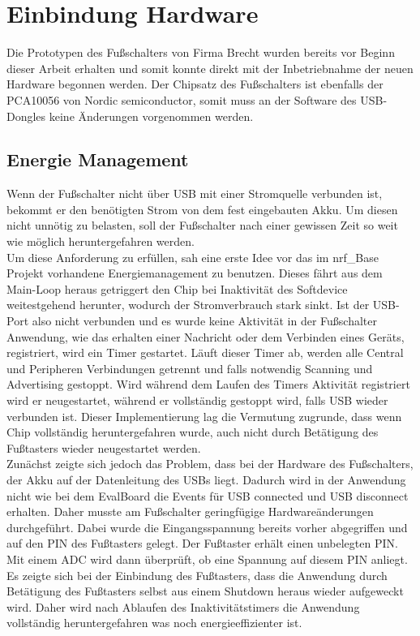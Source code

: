 \section{Einbindung Hardware}
Die Prototypen des Fußschalters von Firma Brecht wurden bereits vor Beginn dieser Arbeit erhalten und somit konnte direkt mit der Inbetriebnahme der neuen Hardware begonnen werden. Der Chipsatz des Fußschalters ist ebenfalls der PCA10056 von Nordic semiconductor, somit muss an der Software des USB-Dongles keine Änderungen vorgenommen werden.

\subsection{Energie Management}
Wenn der Fußschalter nicht über USB mit einer Stromquelle verbunden ist, bekommt er den benötigten Strom von dem fest eingebauten Akku. Um diesen nicht unnötig zu belasten, soll der Fußschalter nach einer gewissen Zeit so weit wie möglich heruntergefahren werden.\\
Um diese Anforderung zu erfüllen, sah eine erste Idee vor das im nrf\_Base Projekt vorhandene Energiemanagement zu benutzen. Dieses fährt aus dem Main-Loop heraus getriggert den Chip bei Inaktivität des Softdevice weitestgehend herunter, wodurch der Stromverbrauch stark sinkt. Ist der USB-Port also nicht verbunden und es wurde keine Aktivität in der Fußschalter Anwendung, wie das erhalten einer Nachricht oder dem Verbinden eines Geräts, registriert, wird ein Timer gestartet. Läuft dieser Timer ab, werden alle Central und Peripheren Verbindungen getrennt und falls notwendig Scanning und Advertising gestoppt. Wird während dem Laufen des Timers Aktivität registriert wird er neugestartet, während er vollständig gestoppt wird, falls USB wieder verbunden ist. Dieser Implementierung lag die Vermutung zugrunde, dass wenn Chip vollständig heruntergefahren wurde, auch nicht durch Betätigung des Fußtasters wieder neugestartet werden.\\
Zunächst zeigte sich jedoch das Problem, dass bei der Hardware des Fußschalters, der Akku auf der Datenleitung des USBs liegt. Dadurch wird in der Anwendung nicht wie bei dem EvalBoard die Events für USB connected und USB disconnect erhalten. Daher musste am Fußschalter geringfügige Hardwareänderungen durchgeführt. Dabei wurde die Eingangsspannung bereits vorher abgegriffen und auf den PIN des Fußtasters gelegt. Der Fußtaster erhält einen unbelegten PIN. Mit einem ADC wird dann überprüft, ob eine Spannung auf diesem PIN anliegt.\\
Es zeigte sich bei der Einbindung des Fußtasters, dass die Anwendung durch Betätigung des Fußtasters selbst aus einem Shutdown heraus wieder aufgeweckt wird. Daher wird nach Ablaufen des Inaktivitätstimers die Anwendung vollständig heruntergefahren was noch energieeffizienter ist.

